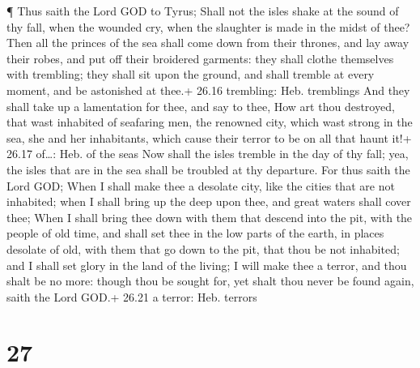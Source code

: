  ¶ Thus saith the Lord GOD to Tyrus; Shall not the isles
shake at the sound of thy fall, when the wounded cry, when the slaughter
is made in the midst of thee?  Then all the princes of the
sea shall come down from their thrones, and lay away their robes, and
put off their broidered garments: they shall clothe themselves with
trembling; they shall sit upon the ground, and shall tremble at every
moment, and be astonished at thee.+ 26.16 trembling: Heb. tremblings
 And they shall take up a lamentation for thee, and say to
thee, How art thou destroyed, that wast inhabited of seafaring men, the
renowned city, which wast strong in the sea, she and her inhabitants,
which cause their terror to be on all that haunt it!+ 26.17 of\ldots:
Heb. of the seas  Now shall the isles tremble in the day of
thy fall; yea, the isles that are in the sea shall be troubled at thy
departure.  For thus saith the Lord GOD; When I shall make
thee a desolate city, like the cities that are not inhabited; when I
shall bring up the deep upon thee, and great waters shall cover thee;
 When I shall bring thee down with them that descend into
the pit, with the people of old time, and shall set thee in the low
parts of the earth, in places desolate of old, with them that go down to
the pit, that thou be not inhabited; and I shall set glory in the land
of the living;  I will make thee a terror, and thou shalt
be no more: though thou be sought for, yet shalt thou never be found
again, saith the Lord GOD.+ 26.21 a terror: Heb. terrors

\hypertarget{section-26}{%
\section{27}\label{section-26}}

